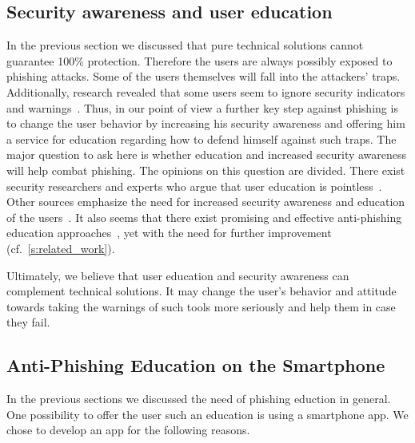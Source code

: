  \subsection{Security awareness and user education}
 \label{s:awareness}
 In the previous section we discussed that pure technical solutions cannot guarantee 100\% protection.
 Therefore the users are always possibly exposed to phishing attacks.
 Some of the users themselves will fall into the attackers' traps.
 Additionally, research revealed that some users seem to ignore security indicators and warnings~\cite{akhawe2013alice}.
 Thus, in our point of view a further key step against phishing is to change the user behavior by increasing his security awareness and offering him a service for education regarding how to defend himself against such traps.
The major question to ask here is whether education and increased security awareness will help combat phishing.
The opinions on this question are divided.
There exist security researchers and experts who argue that user education is pointless~\cite{useredupointless, bruceschneieronsecuritytraining}.
Other sources emphasize the need for increased security awareness and education of the users~\cite{usereducebit, usereduscmagazine}.
It also seems that there exist promising and effective anti-phishing education approaches~\cite{kumaraguru2007protecting, sheng2007antiphishingphil}, yet with the need for further improvement (cf.~\autoref{s:related_work}).

Ultimately, we believe that user education and security awareness can complement technical solutions. It may change the user's behavior and attitude towards taking the warnings of such tools more seriously and help them in case they fail.

\subsection{Anti-Phishing Education on the Smartphone}
\label{s:antiphishing_on_smartphone}
In the previous sections we discussed the need of phishing eduction in general. One possibility to offer the user such an education is using a smartphone app.
We chose to develop an app for the following reasons.


